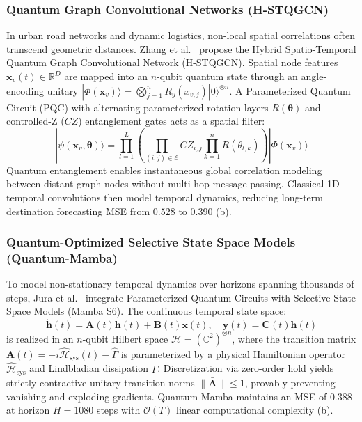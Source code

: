 \subsubsection{Quantum Graph Convolutional Networks (H-STQGCN)}
In urban road networks and dynamic logistics, non-local spatial correlations often transcend geometric distances. Zhang et al.~\cite{Zhang2025HSTQGCN} propose the Hybrid Spatio-Temporal Quantum Graph Convolutional Network (H-STQGCN). Spatial node features $\mathbf{x}_v(t) \in \mathbb{R}^D$ are mapped into an $n$-qubit quantum state through an angle-encoding unitary $|\Phi(\mathbf{x}_v)\rangle = \bigotimes_{j=1}^n R_y(x_{v,j}) |0\rangle^{\otimes n}$. A Parameterized Quantum Circuit (PQC) with alternating parameterized rotation layers $R(\boldsymbol{\theta})$ and controlled-Z ($CZ$) entanglement gates acts as a spatial filter:
\begin{equation}
    |\psi(\mathbf{x}_v, \boldsymbol{\theta})\rangle = \prod_{l=1}^L \left( \prod_{(i, j) \in \mathcal{E}} CZ_{i,j} \prod_{k=1}^n R(\theta_{l,k}) \right) |\Phi(\mathbf{x}_v)\rangle
\end{equation}
Quantum entanglement enables instantaneous global correlation modeling between distant graph nodes without multi-hop message passing. Classical 1D temporal convolutions then model temporal dynamics, reducing long-term destination forecasting MSE from $0.528$ to $0.390$ (b).

\subsubsection{Quantum-Optimized Selective State Space Models (Quantum-Mamba)}
To model non-stationary temporal dynamics over horizons spanning thousands of steps, Jura et al.~\cite{Jura2025QuantumSSM} integrate Parameterized Quantum Circuits with Selective State Space Models (Mamba S6). The continuous temporal state space:
\begin{equation}
    \dot{\mathbf{h}}(t) = \mathbf{A}(t)\mathbf{h}(t) + \mathbf{B}(t)\mathbf{x}(t), \quad \mathbf{y}(t) = \mathbf{C}(t)\mathbf{h}(t)
\end{equation}
is realized in an $n$-qubit Hilbert space $\mathcal{H} = (\mathbb{C}^2)^{\otimes n}$, where the transition matrix $\mathbf{A}(t) = -i \hat{\mathcal{H}}_{\text{sys}}(t) - \hat{\Gamma}$ is parameterized by a physical Hamiltonian operator $\hat{\mathcal{H}}_{\text{sys}}$ and Lindbladian dissipation $\hat{\Gamma}$. Discretization via zero-order hold yields strictly contractive unitary transition norms $\|\bar{\mathbf{A}}\| \le 1$, provably preventing vanishing and exploding gradients. Quantum-Mamba maintains an MSE of $0.388$ at horizon $H = 1080$ steps with $\mathcal{O}(T)$ linear computational complexity (b).

